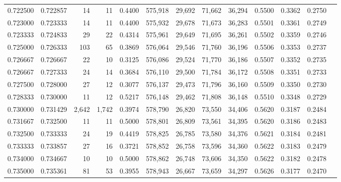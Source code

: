 \begin{tabular}{rrrrrrrrrrrrr}
0.722500 & 0.722857 &     14 &    11 &                                     0.4400 & 575,918 &  29,692 &  71,662 &  36,294 & 0.5500 & 0.3362 & 0.2750 \\
0.723000 & 0.723333 &     14 &    11 &                                     0.4400 & 575,932 &  29,678 &  71,673 &  36,283 & 0.5501 & 0.3361 & 0.2749 \\
0.723333 & 0.724833 &     29 &    22 &                                     0.4314 & 575,961 &  29,649 &  71,695 &  36,261 & 0.5502 & 0.3359 & 0.2746 \\
0.725000 & 0.726333 &    103 &    65 &                                     0.3869 & 576,064 &  29,546 &  71,760 &  36,196 & 0.5506 & 0.3353 & 0.2737 \\
0.726667 & 0.726667 &     22 &    10 &                                     0.3125 & 576,086 &  29,524 &  71,770 &  36,186 & 0.5507 & 0.3352 & 0.2735 \\
0.726667 & 0.727333 &     24 &    14 &                                     0.3684 & 576,110 &  29,500 &  71,784 &  36,172 & 0.5508 & 0.3351 & 0.2733 \\
0.727500 & 0.728000 &     27 &    12 &                                     0.3077 & 576,137 &  29,473 &  71,796 &  36,160 & 0.5509 & 0.3350 & 0.2730 \\
0.728333 & 0.730000 &     11 &    12 &                                     0.5217 & 576,148 &  29,462 &  71,808 &  36,148 & 0.5510 & 0.3348 & 0.2729 \\
0.730000 & 0.731429 &  2,642 & 1,742 &                                     0.3974 & 578,790 &  26,820 &  73,550 &  34,406 & 0.5620 & 0.3187 & 0.2484 \\
0.731667 & 0.732500 &     11 &    11 &                                     0.5000 & 578,801 &  26,809 &  73,561 &  34,395 & 0.5620 & 0.3186 & 0.2483 \\
0.732500 & 0.733333 &     24 &    19 &                                     0.4419 & 578,825 &  26,785 &  73,580 &  34,376 & 0.5621 & 0.3184 & 0.2481 \\
0.733333 & 0.733857 &     27 &    16 &                                     0.3721 & 578,852 &  26,758 &  73,596 &  34,360 & 0.5622 & 0.3183 & 0.2479 \\
0.734000 & 0.734667 &     10 &    10 &                                     0.5000 & 578,862 &  26,748 &  73,606 &  34,350 & 0.5622 & 0.3182 & 0.2478 \\
0.735000 & 0.735361 &     81 &    53 &                                     0.3955 & 578,943 &  26,667 &  73,659 &  34,297 & 0.5626 & 0.3177 & 0.2470 \\

\end{tabular}
